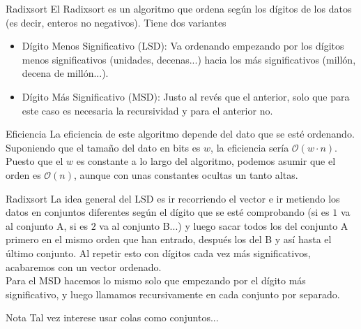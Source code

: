 \documentclass[compress]{beamer}
\begin{document}
\begin{frame}{Radixsort}
El Radixsort es un algoritmo que ordena según los dígitos de los datos (es decir, enteros no negativos). Tiene dos variantes\\
	\begin{itemize}
	\item Dígito Menos Significativo (LSD): Va ordenando empezando por los dígitos menos significativos (unidades, decenas...) hacia los más significativos (millón, decena de millón...).
	\item Dígito Más Significativo (MSD): Justo al revés que el anterior, solo que para este caso es necesaria la recursividad y para el anterior no.
	\end{itemize}
	\begin{block}{Eficiencia}
	La eficiencia de este algoritmo depende del dato que se esté ordenando. Suponiendo que el tamaño del dato en bits es $w$, la eficiencia sería $\mathcal{O}(w\cdot n)$. Puesto que el $w$ es constante a lo largo del algoritmo, podemos asumir que el orden es $\mathcal{O}(n)$, aunque con unas constantes ocultas un tanto altas.
	\end{block}
\end{frame}

\begin{frame}{Radixsort}
La idea general del LSD es ir recorriendo el vector e ir metiendo los datos en conjuntos diferentes según el dígito que se esté comprobando (si es $1$ va al conjunto A, si es $2$ va al conjunto B...) y luego sacar todos los del conjunto A primero en el mismo orden que han entrado, después los del B y así hasta el último conjunto. Al repetir esto con dígitos cada vez más significativos, acabaremos con un vector ordenado.\\
\vspace{0.20in}
Para el MSD hacemos lo mismo solo que empezando por el dígito más significativo, y luego llamamos recursivamente en cada conjunto por separado.\\
	\begin{exampleblock}{Nota}
	Tal vez interese usar colas como conjuntos...
	\end{exampleblock}
\end{frame}
\end{document}
